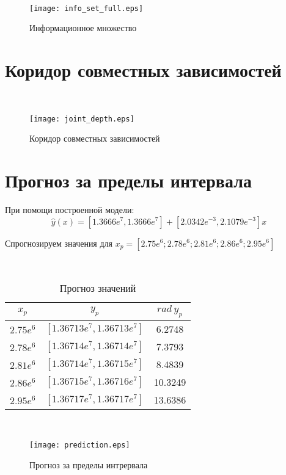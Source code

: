 \documentclass[a4paper,12pt]{article}
\begin{document}
\begin{figure}[h!]~\label{fig5}
\centerline{\texttt{[image: info\_set\_full.eps]}}
\caption{Информационное множество}
\end{figure}

\newpage
\section{Коридор совместных зависимостей}

\begin{figure}[h!]~\label{fig6}
\centerline{\texttt{[image: joint\_depth.eps]}}
\caption{Коридор совместных зависимостей}
\end{figure}


\newpage
\section{Прогноз за пределы интервала}

При помощи построенной модели:
\[
    \hat{y}(x) = [1.3666e^7, 1.3666e^7] + [2.0342e^{-3}, 2.1079e^{-3}]x   
\]

Спрогнозируем значения для $x_p = [2.75e^6; 2.78e^6; 2.81e^6; 2.86e^6; 2.95e^6]$

\begin{table}[h!]~\label{tb1}
    \begin{center}
        \begin{tabular}{|c|c|c|}
            \hline
                $x_p$ & $y_p$ & $rad~y_p$ \\
            \hline
                $2.75e^6$ & $[1.36713e^7, 1.36713e^7]$ & 6.2748 \\
            \hline
                $2.78e^6$ & $[1.36714e^7, 1.36714e^7]$ & 7.3793 \\
            \hline
                $2.81e^6$ & $[1.36714e^7, 1.36715e^7]$ & 8.4839 \\
            \hline
                $2.86e^6$ & $[1.36715e^7, 1.36716e^7]$ & 10.3249 \\
            \hline
                $2.95e^6$ & $[1.36717e^7, 1.36717e^7]$ & 13.6386 \\
            \hline
        \end{tabular}
    \caption{Прогноз значений}
    \end{center}
\end{table}

\begin{figure}[h!]~\label{fig7}
\centerline{\texttt{[image: prediction.eps]}}
\caption{Прогноз за пределы интрервала}
\end{figure}
\end{document}
